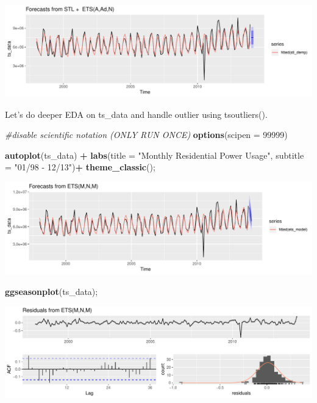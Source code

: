 \documentclass[openany]{book}
\newenvironment{Shaded}{\begin{snugshade}}{\end{snugshade}}
\newcommand{\KeywordTok}[1]{\textcolor[rgb]{0.13,0.29,0.53}{\textbf{#1}}}
\newcommand{\DataTypeTok}[1]{\textcolor[rgb]{0.13,0.29,0.53}{#1}}
\newcommand{\DecValTok}[1]{\textcolor[rgb]{0.00,0.00,0.81}{#1}}
\newcommand{\StringTok}[1]{\textcolor[rgb]{0.31,0.60,0.02}{#1}}
\newcommand{\CommentTok}[1]{\textcolor[rgb]{0.56,0.35,0.01}{\textit{#1}}}
\newcommand{\OperatorTok}[1]{\textcolor[rgb]{0.81,0.36,0.00}{\textbf{#1}}}
\newcommand{\NormalTok}[1]{#1}
\begin{document}
\includegraphics{Part-B-AS_files/figure-latex/unnamed-chunk-6-1.pdf}

Let's do deeper EDA on ts\_data and handle outlier using tsoutliers().

\begin{Shaded}
\begin{Highlighting}[]
\CommentTok{#disable scientific notation (ONLY RUN ONCE)}
\KeywordTok{options}\NormalTok{(}\DataTypeTok{scipen =} \DecValTok{99999}\NormalTok{)}

\KeywordTok{autoplot}\NormalTok{(ts_data) }\OperatorTok{+}
\KeywordTok{labs}\NormalTok{(}\DataTypeTok{title =} \StringTok{"Monthly Residential Power Usage"}\NormalTok{, }\DataTypeTok{subtitle =} \StringTok{"01/98 - 12/13"}\NormalTok{)}\OperatorTok{+}
\KeywordTok{theme_classic}\NormalTok{();}
\end{Highlighting}
\end{Shaded}

\includegraphics{Part-B-AS_files/figure-latex/unnamed-chunk-7-1.pdf}

\begin{Shaded}
\begin{Highlighting}[]
\KeywordTok{ggseasonplot}\NormalTok{(ts_data);}
\end{Highlighting}
\end{Shaded}

\includegraphics{Part-B-AS_files/figure-latex/unnamed-chunk-7-2.pdf}
\end{document}
